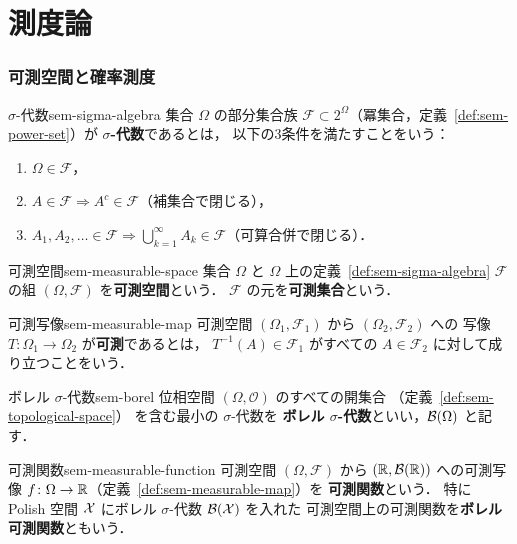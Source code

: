 \chapter{測度論}
\label{ch:found-measure}

\subsection{可測空間と確率測度}
\label{sec:sem-measurable}

\begin{definition}{$\sigma$-代数}{sem-sigma-algebra}
  集合 $\Omega$ の部分集合族 $\mathcal{F} \subset 2^{\Omega}$（冪集合，定義~\ref{def:sem-power-set}）が
  \textbf{$\sigma$-代数}であるとは，
  以下の3条件を満たすことをいう：
  \begin{enumerate}
    \item[(i)] $\Omega \in \mathcal{F}$，
    \item[(ii)] $A \in \mathcal{F} \Longrightarrow A^c \in \mathcal{F}$（補集合で閉じる），
    \item[(iii)] $A_1, A_2, \ldots \in \mathcal{F} \Longrightarrow
      \bigcup_{k=1}^{\infty} A_k \in \mathcal{F}$（可算合併で閉じる）．
  \end{enumerate}
\end{definition}

\begin{definition}{可測空間}{sem-measurable-space}
  集合 $\Omega$ と $\Omega$ 上の定義~\ref{def:sem-sigma-algebra} $\mathcal{F}$ の組
  $(\Omega, \mathcal{F})$ を\textbf{可測空間}という．
  $\mathcal{F}$ の元を\textbf{可測集合}という．
\end{definition}

\begin{definition}{可測写像}{sem-measurable-map}
  可測空間 $(\Omega_1, \mathcal{F}_1)$ から $(\Omega_2, \mathcal{F}_2)$ への
  写像 $T \colon \Omega_1 \to \Omega_2$ が\textbf{可測}であるとは，
  $T^{-1}(A) \in \mathcal{F}_1$ がすべての $A \in \mathcal{F}_2$ に対して成り立つことをいう．
\end{definition}

\begin{definition}{ボレル $\sigma$-代数}{sem-borel}
  位相空間 $(\Omega, \mathcal{O})$ のすべての開集合
  （定義~\ref{def:sem-topological-space}）
  を含む最小の $\sigma$-代数を
  \textbf{ボレル $\sigma$-代数}といい，$\mathcal{B}(\Omega)$ と記す．
\end{definition}

\begin{definition}{可測関数}{sem-measurable-function}
  可測空間 $(\Omega, \mathcal{F})$ から $(\mathbb{R}, \mathcal{B}(\mathbb{R}))$ への可測写像
  $f \colon \Omega \to \mathbb{R}$（定義~\ref{def:sem-measurable-map}）を
  \textbf{可測関数}という．
  特に Polish 空間 $\mathcal{X}$ にボレル $\sigma$-代数 $\mathcal{B}(\mathcal{X})$ を入れた
  可測空間上の可測関数を\textbf{ボレル可測関数}ともいう．
\end{definition}

